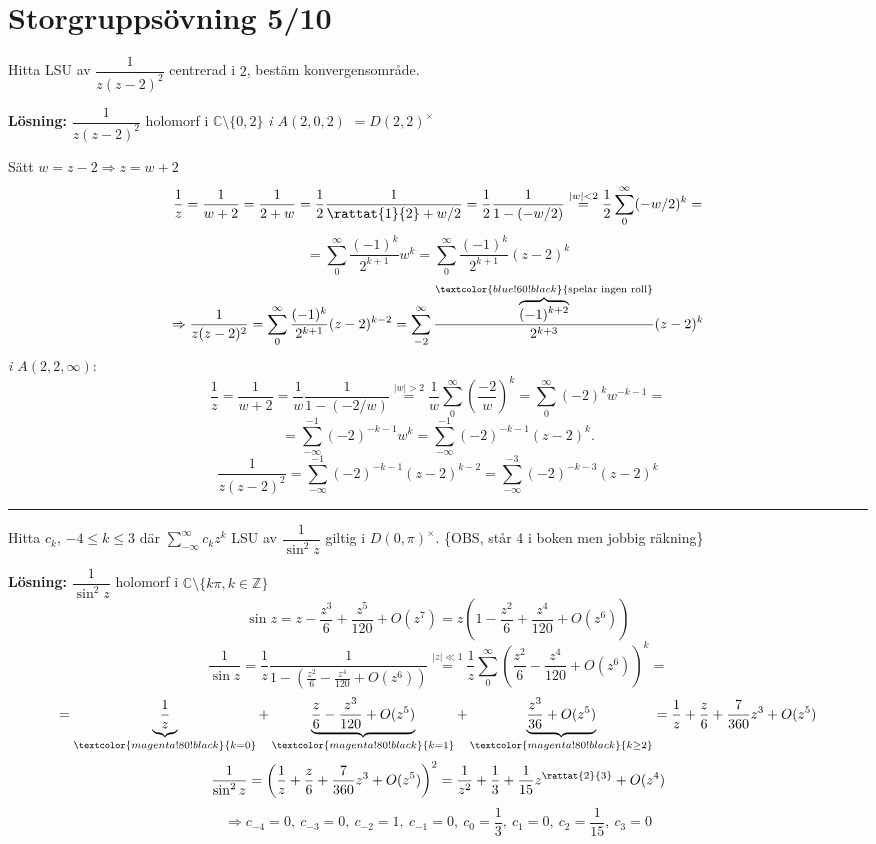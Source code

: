 \section{Storgruppsövning 5/10}

 \quad Hitta LSU av $\dfrac{1}{z(z - 2)^2}$ centrerad i $2$, bestäm konvergensområde.

\textbf{Lösning:} $\dfrac{1}{z(z - 2)^2}$ holomorf i $\mathbb{C} \setminus \{0, 2\}$ \qquad {}
\emph{i $A(2, 0, 2)$} $= D(2, 2)^\times$

Sätt $w = z - 2 \Rightarrow z = w + 2$
\[ \frac{1}{z} = \frac{1}{w + 2} = \frac{1}{2 + w} = \frac{1}{2} \frac{1}{\rattat{1}{2} + w/2} = \frac{1}{2} \frac{1}{1 - (-w/2)} \overset{|w| < 2}{=} \frac{1}{2} \sum_0^\infty (-w/2)^k = \]
\[ = \sum_0^\infty \frac{(-1)^k}{2^{k+1}} w^k = \sum_0^\infty \frac{(-1)^k}{2^{k+1}} (z - 2)^k \]
\[ \Rightarrow \frac{1}{z(z - 2)^2} = \sum_0^\infty \frac{(-1)^k}{2^{k+1}} (z - 2)^{k-2} = \sum_{-2}^\infty \frac{\overbrace{(-1)^{k+2}}^{\textcolor{blue!60!black}{\text{spelar ingen roll}}}}{2^{k+3}} (z - 2)^k \]
\emph{i $A(2, 2, \infty)$}:
\[ \frac{1}{z} = \frac{1}{w + 2} = \frac{1}{w} \frac{1}{1 - (-2/w)} \overset{|w| > 2}{=} \frac{1}{w} \sum_0^\infty \left( \frac{-2}{w} \right)^k = \sum_0^\infty (-2)^k w^{-k-1} = \]
\[ = \sum_{-\infty}^{-1} (-2)^{-k-1} w^k = \sum_{-\infty}^{-1} (-2)^{-k-1} (z - 2)^k. \]
\[ \frac{1}{z(z - 2)^2} = \sum_{-\infty}^{-1} (-2)^{-k-1} (z - 2)^{k-2} = \sum_{-\infty}^{-3} (-2)^{-k-3} (z - 2)^k \]

\noindent\rule{\linewidth}{0.4pt}

 \quad Hitta $c_k$, $-4 \le k \le 3$ där $\sum_{-\infty}^\infty c_k z^k$ LSU av $\dfrac{1}{\sin^2 z}$ giltig i $D(0, \pi)^\times$. \quad \{OBS, står 4 i boken men jobbig räkning\}

\textbf{Lösning:} $\dfrac{1}{\sin^2 z}$ holomorf i $\mathbb{C} \setminus \{k\pi, k \in \mathbb{Z}\}$
\[ \sin z = z - \frac{z^3}{6} + \frac{z^5}{120} + O(z^7) = z\left( 1 - \frac{z^2}{6} + \frac{z^4}{120} + O(z^6) \right) \]
\[ \frac{1}{\sin z} = \frac{1}{z} \frac{1}{1 - \left( \frac{z^2}{6} - \frac{z^4}{120} + O(z^6) \right)} \overset{|z| \ll 1}{=} \frac{1}{z} \sum_0^\infty \left( \frac{z^2}{6} - \frac{z^4}{120} + O(z^6) \right)^k = \]
\[ = \underbrace{\frac{1}{z}}_{\textcolor{magenta!80!black}{k = 0}} + \underbrace{\frac{z}{6} - \frac{z^3}{120} + O(z^5)}_{\textcolor{magenta!80!black}{k = 1}} + \underbrace{\frac{z^3}{36} + O(z^5)}_{\textcolor{magenta!80!black}{k \ge 2}} = \frac{1}{z} + \frac{z}{6} + \frac{7}{360} z^3 + O(z^5) \]
\[ \frac{1}{\sin^2 z} = \left( \frac{1}{z} + \frac{z}{6} + \frac{7}{360} z^3 + O(z^5) \right)^2 = \frac{1}{z^2} + \frac{1}{3} + \frac{1}{15} z^{\rattat{2}{3}} + O(z^4) \]
\[ \Rightarrow c_{-4} = 0,\ c_{-3} = 0,\ c_{-2} = 1,\ c_{-1} = 0,\ c_0 = \frac{1}{3},\ c_1 = 0,\ c_2 = \frac{1}{15},\ c_3 = 0 \]
